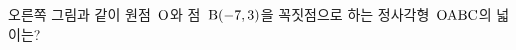 \noindent\begin{minipage}[t]{0.58\linewidth}\vspace{0pt}\raggedright 오른쪽 그림과 같이 원점~$\mathrm{O}$와 점~$\mathrm{B}(-7{,}\mkern3mu\mathopen{}3)$을 꼭짓점으로 하는 정사각형~$\mathrm{OABC}$의 넓이는?\end{minipage}\hfill\begin{minipage}[t]{0.4\linewidth}\vspace{0pt}\centering \resizebox{\ifdim\width>\linewidth\linewidth\else\width\fi}{!}{}\end{minipage}\par
{}
